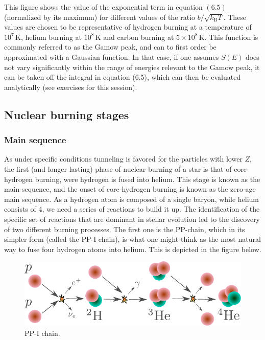 \documentclass[twocolumn]{article}
\begin{document}
This figure shows the value of the exponential term in equation
\((6.5)\) (normalized by its maximum) for different values of the ratio
\(b/\sqrt{k_\mathrm{B}T}\). These values are chosen to be representative
of hydrogen burning at a temperature of \(10^7\,\mathrm{K}\), helium
burning at \(10^8\,\mathrm{K}\) and carbon burning at
\(5\times 10^{8}\,\mathrm{K}\). This function is commonly referred to as
the Gamow peak, and can to first order be approximated with a Gaussian
function. In that case, if one assumes \(S(E)\) does not vary
significantly within the range of energies relevant to the Gamow peak,
it can be taken off the integral in equation (6.5), which can then be
evaluated analytically (see exercises for this session).

\hypertarget{nuclear-burning-stages}{%
\subsection{Nuclear burning stages}\label{nuclear-burning-stages}}

\hypertarget{main-sequence}{%
\subsubsection{Main sequence}\label{main-sequence}}

As under specific conditions tunneling is favored for the particles with
lower \(Z\), the first (and longer-lasting) phase of nuclear burning of
a star is that of core-hydrogen burning, were hydrogen is fused into
helium. This stage is known as the main-sequence, and the onset of
core-hydrogen burning is known as the zero-age main sequence. As a
hydrogen atom is composed of a single baryon, while helium consists of
4, we need a series of reactions to build it up. The identification of
the specific set of reactions that are dominant in stellar evolution led
to the discovery of two different burning processes. The first one is
the PP-chain, which in its simpler form (called the PP-I chain), is what
one might think as the most natural way to fuse four hydrogen atoms into
helium. This is depicted in the figure below.

\begin{figure}
\centering
\includegraphics{../assets/7_nucleo1/PPI.pdf}
\caption{PP-I chain.}
\end{figure}
\end{document}
